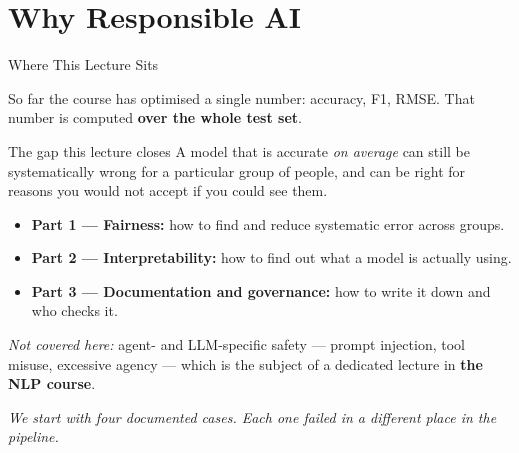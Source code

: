 \section{Why Responsible AI}

\begin{frame}{Where This Lecture Sits}

    So far the course has optimised a single number: accuracy, F1, RMSE. That number is computed
    \textbf{over the whole test set}.

    \vspace{1em}

    \begin{block}{The gap this lecture closes}
        A model that is accurate \emph{on average} can still be systematically wrong for a
        particular group of people, and can be right for reasons you would not accept if you
        could see them.
    \end{block}

    \vspace{1em}

    \begin{itemize}
        \setlength\itemsep{0.5em}
        \item \textbf{Part 1 --- Fairness:} how to find and reduce systematic error across groups.
        \item \textbf{Part 2 --- Interpretability:} how to find out what a model is actually using.
        \item \textbf{Part 3 --- Documentation and governance:} how to write it down and who checks it.
    \end{itemize}

    \vspace{0.5em}
    \centering
    \small
    \textit{Not covered here:} agent- and LLM-specific safety --- prompt injection, tool misuse,
    excessive agency --- which is the subject of a dedicated lecture in \textbf{the NLP course}.

    \vspace{0.6em}
    \normalsize
    \textit{We start with four documented cases. Each one failed in a different place in the pipeline.}
\end{frame}

